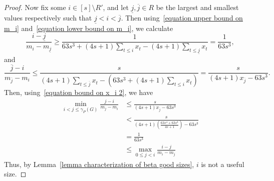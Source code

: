 \documentclass[10pt,a4paper]{amsart}
\begin{document}
\begin{proof}
            Now fix some $i\in [s]\setminus R'$, and let $\underline{j},\overline{j}\in R$ be the largest and smallest values respectively such that $\underline{j}<i<\overline{j}$.
            Then using~\eqref{equation upper bound on m_i} and~\eqref{equation lower bound on m_i}, we calculate
                \[ \frac{i-\underline{j}}{m_i-m_{\underline{j}}}\geq \frac{1}{63s^3+ (4s+1)\displaystyle\sum_{t\leq i} x_t-(4s+1)\sum_{t\leq \underline{j}}x_t}=\frac{1}{63s^3}, \]
            and
                \[ \frac{\overline{j}-i}{m_{\overline{j}}-m_i}\leq \frac{s}{(4s+1)\displaystyle\sum_{t\leq \overline{j}}x_t-\left(63s^3+ (4s+1)\displaystyle\sum_{t\leq i} x_t\right)}=\frac{s}{(4s+1)x_{\overline{j}}-63s^3}. \]
            Then, using~\eqref{equation bound on x_i 2}, we have 
            \begin{align*}
                \min_{i<j\leq \gamma_P(G)}\frac{j-i}{m_j-m_i} &\leq \frac{s}{(4s+1)x_{\overline{j}}-63s^3} \\
            & < \frac{s}{(4s+1)\left(\displaystyle\frac{63s^4+63s^3}{4s+1}\right)-63s^3} \\
            & =\frac{1}{63s^3} \\
            & \leq\max_{0\leq j<i}\frac{i-j}{m_i-m_j}
            \end{align*}
            Thus, by Lemma~\ref{lemma characterization of beta good sizes}, $i$ is not a useful size.
            
        \end{proof}
\end{document}
